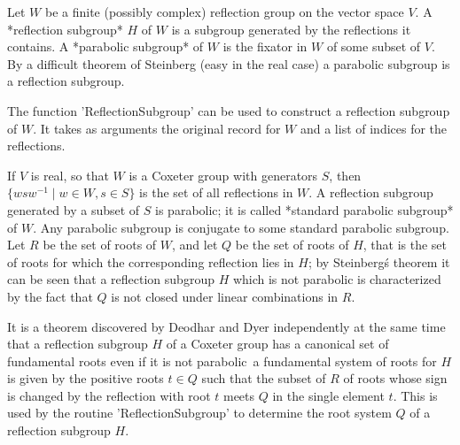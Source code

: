 

Let $W$  be a finite (possibly  complex) reflection group on  the vector
space $V$. A *reflection subgroup* $H$ of $W$ is a subgroup generated by
the  reflections it  contains.  A  *parabolic subgroup*  of  $W$ is  the
fixator  in  $W$ of  some  subset  of $V$.  By  a  difficult theorem  of
Steinberg (easy in  the real case) a parabolic subgroup  is a reflection
subgroup.

The function 'ReflectionSubgroup' can be  used to construct a reflection
subgroup of $W$. It takes as arguments the original record for $W$ and a
list of indices for the reflections.

If $V$ is real, so that $W$ is a Coxeter group with generators $S$, then
$\{wsw^{-1} \mid  w \in W,  s\in S\}$ is the  set of all  reflections in
$W$. A reflection subgroup generated by a subset of $S$ is parabolic; it
is called *standard  parabolic subgroup* of $W$.  Any parabolic subgroup
is conjugate to some standard parabolic  subgroup. Let $R$ be the set of
roots of $W$,  and let $Q$ be the  set of roots of $H$, that  is the set
of  roots  for  which  the  corresponding reflection  lies  in  $H$;  by
Steinberg\'s theorem it can be seen that a reflection subgroup $H$ which
is not  parabolic is characterized  by the fact  that $Q$ is  not closed
under linear combinations in $R$.

It is a theorem discovered by Deodhar \cite{Deo89} and Dyer \cite{Dye90}
independently  at the  same time  that a  reflection subgroup  $H$ of  a
Coxeter group has a canonical set of fundamental roots even if it is not
parabolic\:\  a fundamental  system of  roots for  $H$ is  given by  the
positive roots $t \in Q$ such that the subset of $R$ of roots whose sign
is  changed by  the reflection  with root  $t$ meets  $Q$ in  the single
element  $t$.  This  is  used by  the  routine  'ReflectionSubgroup'  to
determine  the  root system  $Q$  of  a  reflection subgroup  $H$.

